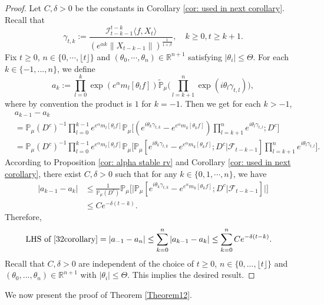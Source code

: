 \documentclass[12pt,a4paper]{amsart}
\theoremstyle{plain}
\theoremstyle{definition}
\numberwithin{equation}{section}
\begin{document}
\begin{proof}
	Let $C,\delta > 0$ be the constants in Corollary \ref{cor: used in next corollary}.
    Recall that \[\gamma_{t,k}:=\frac {\mathcal I_{t-k-1}^{t-k}\langle f ,X_t\rangle}{(e^{\alpha k}\|X_{t-k-1}\|)^\frac{1}{1+\beta}},\quad k \geq 0, t\geq k+1. \]
        Fix $t\geq 0$, $n \in \{0, \cdots, \lfloor t \rfloor\}$ and $(\theta_0, \cdots, \theta_n)\in \mathbb R^{n+1}$
    satisfying $|\theta_i|\leq \Theta$.
    For each $k\in\{-1,...,n\}$, we define
    \[a_k:=\prod_{l=0}^{k}\exp(e^{\alpha}m_l[\theta_lf])\mathbb{\tilde{P}}_{\mu}\Big(\prod_{l=k+1}^{n}\exp\left(i\theta_l\gamma_{t,l}\right)\Big),\]
     where by convention the product is $1$ for $k=-1$. Then we get for each $k > -1$,
    \begin{align*}
        &a_{k-1} - a_k
        \\&=\mathbb{P}_{\mu}(D^c)^{-1}\prod_{l=0}^{k-1}e^{e^{\alpha}m_l[\theta_l f]}\mathbb{P}_{\mu}\Big[(e^{i\theta_{k}\gamma_{t,k}}-e^{e^{\alpha}m_k[\theta_k f]})\prod_{l=k+1}^ne^{i\theta_{l}\gamma_{t,l}};D^c\Big]
        \\&=\mathbb{P}_{\mu}(D^c)^{-1}\prod_{l=0}^{k-1}e^{e^{\alpha}m_l[\theta_l f]}\mathbb{P}_{\mu}\Big[\mathbb P_\mu[e^{i\theta_{k}\gamma_{t,k}}-e^{e^{\alpha}m_k[\theta_k f]}; D^c|\mathscr F_{t-k-1}]\prod_{l=k+1}^ne^{i\theta_{l}\gamma_{t,l}}\Big].
    \end{align*}
  According to Proposition \ref{cor: alpha stable rv} and Corollary \ref{cor: used in next corollary},
    there exist $C,\delta>0$ such that for any
        $k\in\{0, 1, \cdots, n\}$, we have
    \begin{align*}
        |a_{k-1}- a_k|
        &\leq \frac{1}{\mathbb{P}_{\mu}(D^c)}\mathbb{P}_{\mu}\Big[\big|\mathbb P_\mu[e^{i\theta_{k}\gamma_{t,k}}-e^{e^{\alpha}m_k[\theta_k f]}; D^c\big|\mathscr{F}_{t-k-1}]\big|\Big]
        \\& \leq C e^{-\delta(t-k)}.
    \end{align*}
Therefore,
\begin{equation}\begin{split}
    \text{LHS of \eqref{32corollary}}&= \left|a_{-1}-a_n\right|
    \leq\sum_{k=0}^n\left|a_{k-1}-a_k\right|
    \leq \sum_{k=0}^n C e^{-\delta(t-k)}.
\end{split}\end{equation}
	Recall that $C, \delta>0$ are independent of the choice of $t\geq 0$, $n \in \{0,...,\lfloor t \rfloor\}$ and $(\theta_0,...,\theta_n)\in \mathbb R^{n+1}$ with $|\theta_i|\leq \Theta$.
    This implies the desired result.
\end{proof}
We now present the proof of Theorem \ref{Theorem12}.
\bigskip
\end{document}
